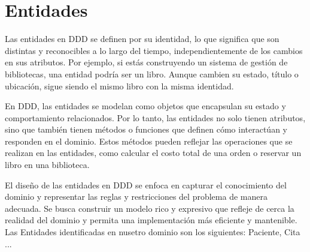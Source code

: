 \section*{Entidades}
Las entidades en DDD se definen por su identidad, lo que significa que son distintas y reconocibles a lo largo del tiempo,
independientemente de los cambios en sus atributos. Por ejemplo, si estás construyendo un sistema de gestión de bibliotecas,
una entidad podría ser un libro. Aunque cambien su estado, título o ubicación, sigue siendo el mismo libro con la misma identidad.

En DDD, las entidades se modelan como objetos que encapsulan su estado y comportamiento relacionados. Por lo tanto,
las entidades no solo tienen atributos, sino que también tienen métodos o funciones que definen cómo interactúan y
responden en el dominio. Estos métodos pueden reflejar las operaciones que se realizan en las entidades, como calcular
el costo total de una orden o reservar un libro en una biblioteca.

El diseño de las entidades en DDD se enfoca en capturar el conocimiento del dominio y representar las reglas y
restricciones del problema de manera adecuada. Se busca construir un modelo rico y expresivo que refleje de cerca
la realidad del dominio y permita una implementación más eficiente y mantenible.
Las Entidades identificadas en nusetro dominio son los siguientes: Paciente, Cita ...



